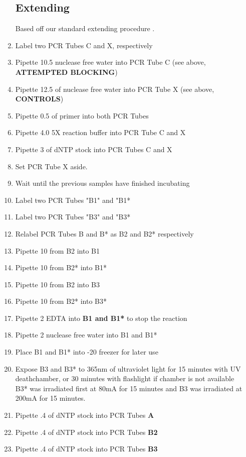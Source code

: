 \documentclass{ssiBio}
\begin{document}
\begin{enumerate}
\subsection{Extending}
Based off our standard \tdt{} extending procedure \cite{genTdT}.
\item{Label two PCR Tubes C and X, respectively}
\item{Pipette 10.5\uL{} nuclease free water into PCR Tube C (see above, \textbf{ATTEMPTED BLOCKING})}
\item{Pipette 12.5\uL{} of nuclease free water into PCR Tube X (see above, \textbf{CONTROLS})}
\item{Pipette 0.5\uL{} of primer into both PCR Tubes}
\item{Pipette 4.0\uL{} 5X \tdt{} reaction buffer into PCR Tube C and X}
\item{Pipette 3\uL{} of dNTP stock into PCR Tubes C and X}
\item{Set PCR Tube X aside.}
\item{Wait until the previous samples have finished incubating}
\item{Label two PCR Tubes "B1" and "B1*}
\item{Label two PCR Tubes "B3" and "B3*}
\item{Relabel PCR Tubes B and B* as B2 and B2* respectively}
\item{Pipette 10\uL{} from B2 into B1}
\item{Pipette 10\uL{} from B2* into B1*}
\item{Pipette 10\uL{} from B2 into B3}
\item{Pipette 10\uL{} from B2* into B3*}
\item{Pipette 2\uL{} EDTA into \textbf{B1 and B1*} to stop the reaction \cite{Invitrogen2002}}\\
\item{Pipette 2\uL{} nuclease free water into B1 and B1*}
\item{Place B1 and B1* into -20\C{} freezer for later use}
\item{Expose B3 and B3* to 365nm of ultraviolet light for 15 minutes with UV deathchamber, or 30 minutes with flashlight if chamber is not available}\\
	B3* was irradiated first at 80mA for 15 minutes and B3 was irradiated at 200mA for 15 minutes.
\item{Pipette .4\uL{} of dNTP stock into PCR Tubes \textbf{A}}
\item{Pipette .4\uL{} of dNTP stock into PCR Tubes \textbf{B2}}
\item{Pipette .4\uL{} of dNTP stock into PCR Tubes \textbf{B3}}

\end{enumerate}
\end{document}
